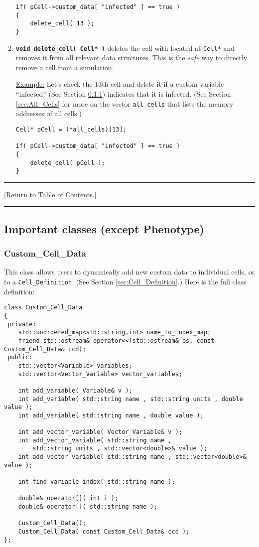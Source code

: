 \documentclass[12pt]{article}
\renewcommand{\v}{\verb}
\newcommand{\smallcode}[1]{\textbf{\texttt{#1}}}
\newcommand{\TOClink}{\begin{center}\hrule\vskip-10pt\phantom{.}\hfill[Return to \hyperlink{TOC}{Table of Contents}.]\hfill\phantom{.}\vskip3pt\hrule\end{center}}
\begin{document}
\begin{enumerate}
\begin{verbatim}
if( pCell->custom_data[ "infected" ] == true )
{
    delete_cell( 13 ); 
}
\end{verbatim}

\item 
\smallcode{void delete\_cell( Cell* )} deletes the cell 
with located at \v|Cell*| and removes it from 
all relevant data structures.  
This is the \emph{safe} way to directly remove a cell 
from a simulation. 

\underline{Example:} Let's check the 13th cell  and delete it 
if a custom variable ``infected'' (See Section \ref{sec:Custom_Cell_Data}) indicates that 
 it is infected. (See Section \ref{sec:All_Cells} for more 
on the vector \v|all_cells| that lists the memory addresses of all cells.)
 
\begin{verbatim}
Cell* pCell = (*all_cells)[13]; 

if( pCell->custom_data[ "infected" ] == true )
{
    delete_cell( pCell ); 
}
\end{verbatim}
\end{enumerate}
 

\TOClink 

\subsection{Important classes (except Phenotype)}

\subsubsection{Custom\_Cell\_Data}
\label{sec:Custom_Cell_Data}
This class allows users to dynamically add new custom data to 
individual cells, or to a \v|Cell_Definition|. (See Section 
\ref{sec:Cell_Definition}.) Here is the full class definition: 

\begin{verbatim}
class Custom_Cell_Data
{
 private:
    std::unordered_map<std::string,int> name_to_index_map; 
    friend std::ostream& operator<<(std::ostream& os, const Custom_Cell_Data& ccd);   
 public:
    std::vector<Variable> variables; 
    std::vector<Vector_Variable> vector_variables; 
    
    int add_variable( Variable& v );   
    int add_variable( std::string name , std::string units , double value );   
    int add_variable( std::string name , double value );   

    int add_vector_variable( Vector_Variable& v );   
    int add_vector_variable( std::string name , 
        std::string units , std::vector<double>& value );   
    int add_vector_variable( std::string name , std::vector<double>& value );   

    int find_variable_index( std::string name );   

    double& operator[]( int i );  
    double& operator[]( std::string name );   
    
    Custom_Cell_Data();   
    Custom_Cell_Data( const Custom_Cell_Data& ccd ); 
};
\end{verbatim}
\end{document}
